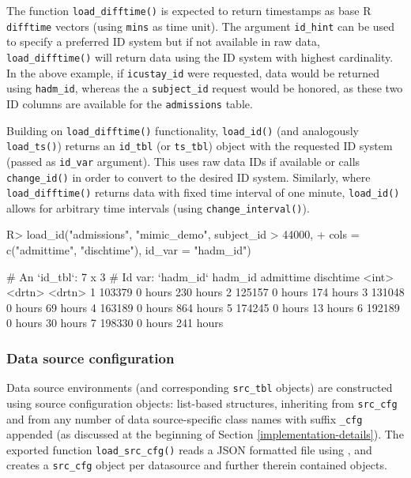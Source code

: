 \documentclass[
  notitle]{jss}
\begin{document}
The function \texttt{load\_difftime()} is expected to return timestamps
as base R \texttt{difftime} vectors (using \texttt{mins} as time unit).
The argument \texttt{id\_hint} can be used to specify a preferred ID
system but if not available in raw data, \texttt{load\_difftime()} will
return data using the ID system with highest cardinality. In the above
example, if \texttt{icustay\_id} were requested, data would be returned
using \texttt{hadm\_id}, whereas the a \texttt{subject\_id} request
would be honored, as these two ID columns are available for the
\texttt{admissions} table.

Building on \texttt{load\_difftime()} functionality, \texttt{load\_id()}
(and analogously \texttt{load\_ts()}) returns an \texttt{id\_tbl} (or
\texttt{ts\_tbl}) object with the requested ID system (passed as
\texttt{id\_var} argument). This uses raw data IDs if available or calls
\texttt{change\_id()} in order to convert to the desired ID system.
Similarly, where \texttt{load\_difftime()} returns data with fixed time
interval of one minute, \texttt{load\_id()} allows for arbitrary time
intervals (using \texttt{change\_interval()}).

\begin{CodeChunk}
\begin{CodeInput}
R> load_id("admissions", "mimic_demo", subject_id > 44000,
+         cols = c("admittime", "dischtime"), id_var = "hadm_id")
\end{CodeInput}
\end{CodeChunk}

\begin{CodeChunk}
\begin{CodeOutput}
# An `id_tbl`: 7 x 3
# Id var:      `hadm_id`
  hadm_id admittime dischtime
    <int> <drtn>    <drtn>
1  103379 0 hours   230 hours
2  125157 0 hours   174 hours
3  131048 0 hours    69 hours
4  163189 0 hours   864 hours
5  174245 0 hours    13 hours
6  192189 0 hours    30 hours
7  198330 0 hours   241 hours
\end{CodeOutput}
\end{CodeChunk}

\hypertarget{data-source-configuration}{%
\subsubsection{Data source
configuration}\label{data-source-configuration}}

Data source environments (and corresponding \texttt{src\_tbl} objects)
are constructed using source configuration objects: list-based
structures, inheriting from \texttt{src\_cfg} and from any number of
data source-specific class names with suffix \texttt{\_cfg} appended (as
discussed at the beginning of Section \ref{implementation-details}). The
exported function \texttt{load\_src\_cfg()} reads a JSON formatted file
using  \citep{ooms2014}, and creates a \texttt{src\_cfg}
object per datasource and further therein contained objects.
\end{document}
